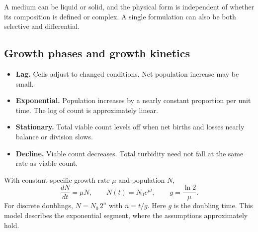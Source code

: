 \documentclass[12pt,a4paper]{article}
\begin{document}
A medium can be liquid or solid, and the physical form is independent of whether its composition is defined or complex. A single formulation can also be both selective and differential.
\subsection{Growth phases and growth kinetics}
\begin{tcolorbox}[tikzbox, title={Conceptual batch growth curve}]
\centering
{}\par
\end{tcolorbox}

\begin{itemize}[leftmargin=*, itemsep=3pt, topsep=4pt]
  \item \textbf{Lag.} Cells adjust to changed conditions. Net population increase may be small.
  \item \textbf{Exponential.} Population increases by a nearly constant proportion per unit time. The log of count is approximately linear.
  \item \textbf{Stationary.} Total viable count levels off when net births and losses nearly balance or division slows.
  \item \textbf{Decline.} Viable count decreases. Total turbidity need not fall at the same rate as viable count.
\end{itemize}
\begin{tcolorbox}[formulabox, title={Exponential growth model}]
With constant specific growth rate $\mu$ and population $N$,
\[
\frac{dN}{dt}=\mu N,\qquad N(t)=N_0e^{\mu t},\qquad
g=\frac{\ln 2}{\mu}.
\]
For discrete doublings, $N=N_0\,2^n$ with $n=t/g$. Here $g$ is the doubling time. This model describes the exponential segment, where the assumptions approximately hold.
\end{tcolorbox}
\end{document}

